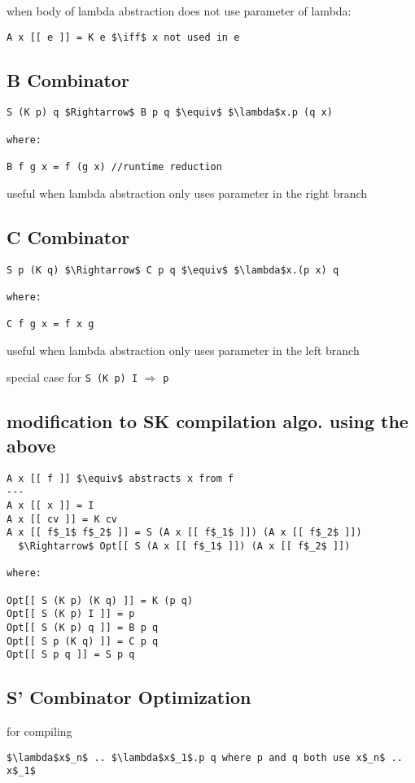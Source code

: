 \documentclass[8pt]{extarticle}
\begin{document}
\begin{multicols*}{2}
when body of lambda abstraction does not use parameter of lambda:
\begin{lstlisting}
A x [[ e ]] = K e $\iff$ x not used in e
\end{lstlisting}

\subsection{B Combinator}

\begin{lstlisting}
S (K p) q $Rightarrow$ B p q $\equiv$ $\lambda$x.p (q x)

where:

B f g x = f (g x) //runtime reduction
\end{lstlisting}

useful when lambda abstraction only uses parameter in the right branch

\subsection{C Combinator}
\begin{lstlisting}
S p (K q) $\Rightarrow$ C p q $\equiv$ $\lambda$x.(p x) q

where:

C f g x = f x g
\end{lstlisting}

useful when lambda abstraction only uses parameter in the left branch

special case for \verb|S (K p) I| $\Rightarrow$ \verb|p|

\subsection{modification to SK compilation algo. using the above}

\begin{lstlisting}
A x [[ f ]] $\equiv$ abstracts x from f
---
A x [[ x ]] = I
A x [[ cv ]] = K cv
A x [[ f$_1$ f$_2$ ]] = S (A x [[ f$_1$ ]]) (A x [[ f$_2$ ]])
  $\Rightarrow$ Opt[[ S (A x [[ f$_1$ ]]) (A x [[ f$_2$ ]])

where:

Opt[[ S (K p) (K q) ]] = K (p q)
Opt[[ S (K p) I ]] = p
Opt[[ S (K p) q ]] = B p q
Opt[[ S p (K q) ]] = C p q
Opt[[ S p q ]] = S p q
\end{lstlisting}

\subsection{S' Combinator Optimization}
for compiling
\begin{lstlisting}
$\lambda$x$_n$ .. $\lambda$x$_1$.p q where p and q both use x$_n$ .. x$_1$
\end{lstlisting}


\end{multicols*}
\end{document}

